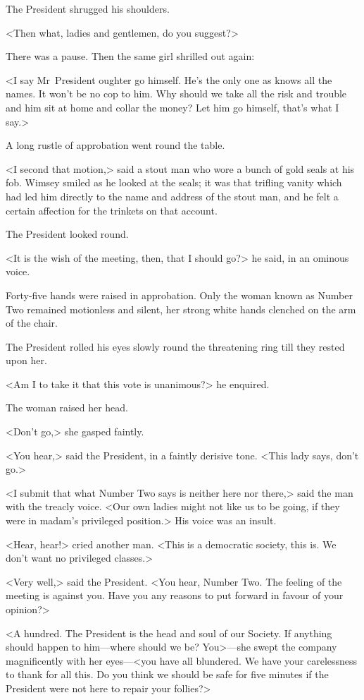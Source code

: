 The President shrugged his shoulders.

<Then what, ladies and gentlemen, do you suggest?>

There was a pause. Then the same girl shrilled out again:

<I say Mr~President oughter go himself. He's the only one as knows all the names. It won't be no cop to him. Why should we take all the risk and trouble and him sit at home and collar the money? Let him go himself, that's what I say.>

A long rustle of approbation went round the table.

<I second that motion,> said a stout man who wore a bunch of gold seals at his fob. Wimsey smiled as he looked at the seals; it was that trifling vanity which had led him directly to the name and address of the stout man, and he felt a certain affection for the trinkets on that account.

The President looked round.

<It is the wish of the meeting, then, that I should go?> he said, in an ominous voice.

Forty-five hands were raised in approbation. Only the woman known as Number Two remained motionless and silent, her strong white hands clenched on the arm of the chair.

The President rolled his eyes slowly round the threatening ring till they rested upon her.

<Am I to take it that this vote is unanimous?> he enquired.

The woman raised her head.

<Don't go,> she gasped faintly.

<You hear,> said the President, in a faintly derisive tone. <This lady says, don't go.>

<I submit that what Number Two says is neither here nor there,> said the man with the treacly voice. <Our own ladies might not like us to be going, if they were in madam's privileged position.> His voice was an insult.

<Hear, hear!> cried another man. <This is a democratic society, this is. We don't want no privileged classes.>

<Very well,> said the President. <You hear, Number Two. The feeling of the meeting is against you. Have you any reasons to put forward in favour of your opinion?>

<A hundred. The President is the head and soul of our Society. If anything should happen to him—where should we be? You>—she swept the company magnificently with her eyes—<you have all blundered. We have your carelessness to thank for all this. Do you think we should be safe for five minutes if the President were not here to repair your follies?>


